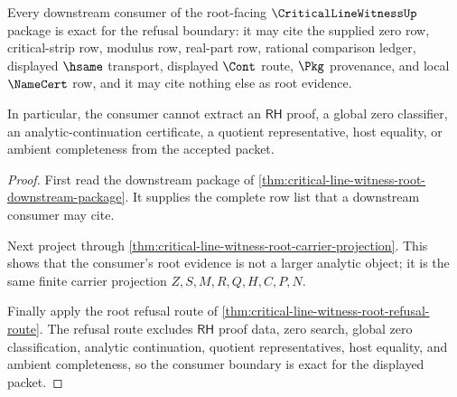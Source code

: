 \begin{theorem}
\label{thm:critical-line-witness-root-refusal-consumer-exactness}
Every downstream consumer of the root-facing $\CriticalLineWitnessUp$ package is exact for the refusal boundary: it may cite the supplied zero row, critical-strip row, modulus row, real-part row, rational comparison ledger, displayed $\hsame$ transport, displayed $\Cont$ route, $\Pkg$ provenance, and local $\NameCert$ row, and it may cite nothing else as root evidence.

In particular, the consumer cannot extract an $\mathsf{RH}$ proof, a global zero classifier, an analytic-continuation certificate, a quotient representative, host equality, or ambient completeness from the accepted packet.
\end{theorem}
\begin{proof}
First read the downstream package of \autoref{thm:critical-line-witness-root-downstream-package}. It supplies the complete row list that a downstream consumer may cite.

Next project through \autoref{thm:critical-line-witness-root-carrier-projection}. This shows that the consumer's root evidence is not a larger analytic object; it is the same finite carrier projection $Z,S,M,R,Q,H,C,P,N$.

Finally apply the root refusal route of \autoref{thm:critical-line-witness-root-refusal-route}. The refusal route excludes $\mathsf{RH}$ proof data, zero search, global zero classification, analytic continuation, quotient representatives, host equality, and ambient completeness, so the consumer boundary is exact for the displayed packet.
\end{proof}

